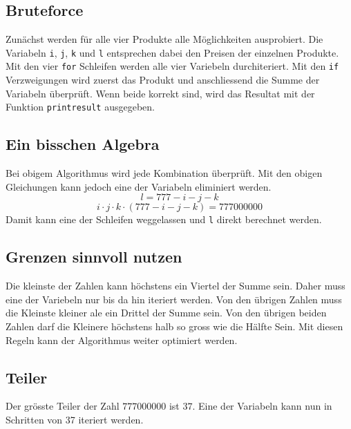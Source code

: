 \documentclass[10pt, fleqn]{article}
\begin{document}
\subsection{Bruteforce}
Zunächst werden für alle vier Produkte alle Möglichkeiten ausprobiert. Die 
Variabeln \verb!i!, \verb!j!, \verb!k! und \verb!l! entsprechen dabei den 
Preisen der einzelnen Produkte. \\
Mit den vier \verb!for! Schleifen werden alle vier Variebeln durchiteriert. 
Mit den \verb!if! Verzweigungen wird zuerst das Produkt und anschliessend die 
Summe der Variabeln überprüft. Wenn beide korrekt sind, wird das Resultat 
mit der Funktion \verb!printresult! ausgegeben. 
% 

\subsection{Ein bisschen Algebra}
Bei obigem Algorithmus wird jede Kombination überprüft. Mit den obigen 
Gleichungen kann jedoch eine der Variabeln eliminiert werden. 
\[ l = 777 - i - j - k \]
\[ i \cdot j \cdot k \cdot (777 - i - j - k) = 777000000 \]
Damit kann eine der Schleifen weggelassen und \verb!l! direkt berechnet werden. 
% 

\subsection{Grenzen sinnvoll nutzen}
Die kleinste der Zahlen kann höchstens ein Viertel der Summe sein. Daher muss 
eine der Variebeln nur bis da hin iteriert werden. Von den übrigen Zahlen muss 
die Kleinste kleiner ale ein Drittel der Summe sein. Von den übrigen beiden 
Zahlen darf die Kleinere höchstens halb so gross wie die Hälfte Sein. Mit 
diesen Regeln kann der Algorithmus weiter optimiert werden. 
% 

\subsection{Teiler}
Der grösste Teiler der Zahl $777000000$ ist $37$. Eine der Variabeln kann nun 
in Schritten von 37 iteriert werden. 
% 
\end{document}
